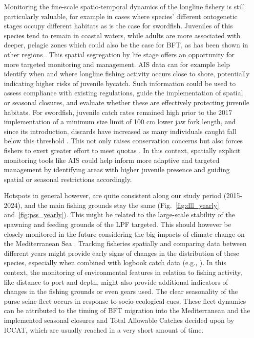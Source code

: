 Monitoring the fine-scale spatio-temporal dynamics of the longline fishery is still particularly
valuable, for example in cases where species' different ontogenetic stages occupy different
habitats as is the case for swordfish. Juveniles of this species tend to remain in coastal waters,
while adults are more associated with deeper, pelagic zones \citep{damalas_14_swo} which could also
be the case for BFT, as has been shown in other regions \citep{bft_juvenile_habitat}. This spatial
segregation by life stage offers an opportunity for more targeted monitoring and management. AIS
data can for example help identify when and where longline fishing activity occurs close to shore,
potentially indicating higher risks of juvenile bycatch. Such information could be used to assess
compliance with existing regulations, guide the implementation of spatial or seasonal closures, and
evaluate whether these are effectively protecting juvenile habitats. For swordfish, juvenile catch
rates remained high prior to the 2017 implementation of a minimum size limit of 100 cm lower jaw
fork length, and since its introduction, discards have increased as many individuals caught fall
below this threshold \citep{iccat_juvenile_catches_swo}. This not only raises conservation concerns
but also forces fishers to exert greater effort to meet quotas \citep{iccat_swo_discards}. In this
context, spatially explicit monitoring tools like AIS could help inform more adaptive and targeted
management by identifying areas with higher juvenile presence and guiding spatial or seasonal
restrictions accordingly.

\medskip

Hotspots in general however, are quite consistent along our study period (2015-2024), and the main
fishing grounds stay the same (Fig.~\ref{fig:dll_yearly} and~\ref{fig:pss_yearly}). This might be
related to the large-scale stability of the spawning and feeding grounds of the LPF targeted. This
should however be closely monitored in the future considering the big impacts of climate change on
the Mediterranean Sea \citep{climate_med,climate_med_2}. Tracking fisheries spatially and comparing
data between different years might provide early signs of changes in the distribution of these
species, especially when combined with logbook catch data (e.g., \citealp{campos_ais_logbook}). In
this context, the monitoring of environmental features in relation to fishing activity, like
distance to port and depth, might also provide additional indicators of changes in the fishing
grounds or even gears used. The clear seasonality of the purse seine fleet occurs in response to
socio-ecological cues. These fleet dynamics can be attributed to the timing of BFT migration into
the Mediterranean and the implemented seasonal closures and Total Allowable Catches decided upon by
ICCAT, which are usually reached in a very short amount of time.

